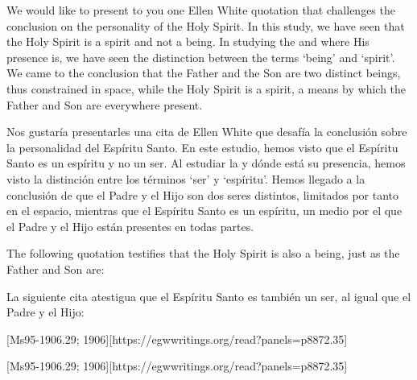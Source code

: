 \label{appendix:unauthenticated-reports}
We would like to present to you one Ellen White quotation that challenges the conclusion on the personality of the Holy Spirit. In this study, we have seen that the Holy Spirit is a spirit and not a being. In studying the  and where His presence is, we have seen the distinction between the terms ‘being’ and ‘spirit’. We came to the conclusion that the Father and the Son are two distinct beings, thus constrained in space, while the Holy Spirit is a spirit, a means by which the Father and Son are everywhere present.


\label{appendix:unauthenticated-reports}
Nos gustaría presentarles una cita de Ellen White que desafía la conclusión sobre la personalidad del Espíritu Santo. En este estudio, hemos visto que el Espíritu Santo es un espíritu y no un ser. Al estudiar la  y dónde está su presencia, hemos visto la distinción entre los términos ‘ser’ y ‘espíritu’. Hemos llegado a la conclusión de que el Padre y el Hijo son dos seres distintos, limitados por tanto en el espacio, mientras que el Espíritu Santo es un espíritu, un medio por el que el Padre y el Hijo están presentes en todas partes.


The following quotation testifies that the Holy Spirit is also a being, just as the Father and Son are:


La siguiente cita atestigua que el Espíritu Santo es también un ser, al igual que el Padre y el Hijo:


[Ms95-1906.29; 1906][https://egwwritings.org/read?panels=p8872.35]


[Ms95-1906.29; 1906][https://egwwritings.org/read?panels=p8872.35]


